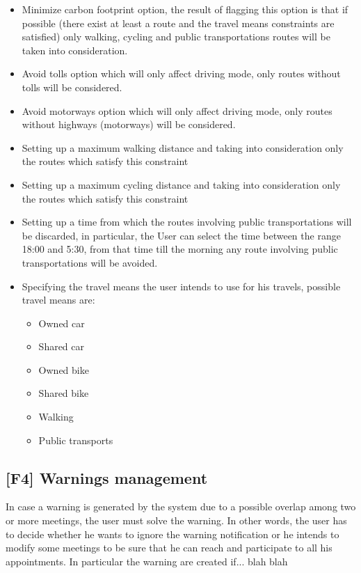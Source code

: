 \begin{itemize}
\item Minimize carbon footprint option, the result of flagging this option is that if possible (there exist at least a route and the travel means constraints are satisfied) only walking, cycling and public transportations routes will be taken into consideration.
\item Avoid tolls option which will only affect driving mode, only routes without tolls will be considered.
\item Avoid motorways option which will only affect driving mode, only routes without highways (motorways) will be considered.
\item Setting up a maximum walking distance and taking into consideration only the routes which satisfy this constraint
\item Setting up a maximum cycling distance and taking into consideration only the routes which satisfy this constraint
\item Setting up a time from which the routes involving public transportations will be discarded, in particular, the User can select the time between the range 18:00 and 5:30, from that time till the morning any route involving public transportations will be avoided.
\item Specifying the travel means the user intends to use for his travels, possible travel means are: \begin{itemize}
\item Owned car
\item Shared car
\item Owned bike
\item Shared bike
\item Walking
\item Public transports
\end{itemize}
\end{itemize}

\subsection{[F4] Warnings management}
In case a warning is generated by the system due to a possible overlap among two or more meetings, the user must solve the warning. In other words, the user has to decide whether he wants to ignore the warning notification or he intends to modify some meetings to be sure that he can reach and participate to all his appointments.
In particular the warning are created if... blah blah

